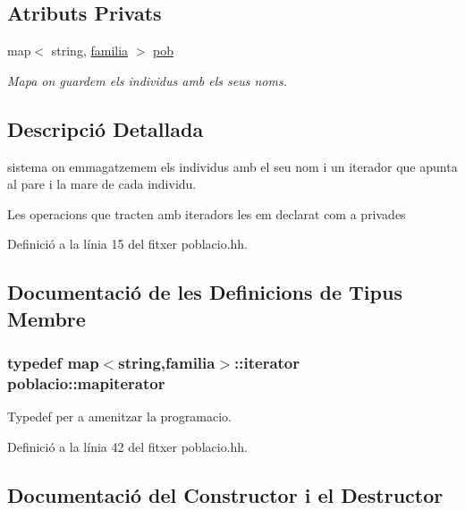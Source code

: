 \subsection*{Atributs Privats}
\begin{DoxyCompactItemize}
\item 
map$<$ string, \hyperlink{structpoblacio_1_1familia}{familia} $>$ \hyperlink{classpoblacio_a7ecb70033b151a937143b07d489c4c17}{pob}
\begin{DoxyCompactList}\small\item\em Mapa on guardem els individus amb els seus noms. \end{DoxyCompactList}\end{DoxyCompactItemize}


\subsection{Descripció Detallada}
sistema on emmagatzemem els individus amb el seu nom i un iterador que apunta al pare i la mare de cada individu. 

Les operacions que tracten amb iteradors les em declarat com a privades 

Definició a la línia 15 del fitxer poblacio.\+hh.



\subsection{Documentació de les Definicions de Tipus Membre}
\subsubsection[{\texorpdfstring{mapiterator}{mapiterator}}]{\setlength{\rightskip}{0pt plus 5cm}typedef map$<$string,{\bf familia}$>$\+::iterator {\bf poblacio\+::mapiterator}\hspace{0.3cm}{\ttfamily [private]}}\hypertarget{classpoblacio_a52c3d96b08f7679f27487e7499185ed1}{}\label{classpoblacio_a52c3d96b08f7679f27487e7499185ed1}


Typedef per a amenitzar la programacio. 



Definició a la línia 42 del fitxer poblacio.\+hh.



\subsection{Documentació del Constructor i el Destructor}
